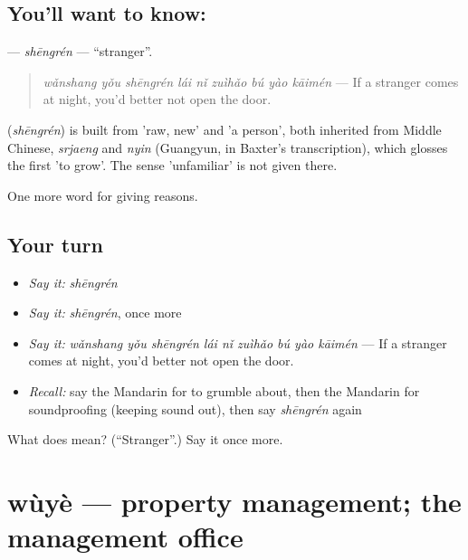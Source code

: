 \subsection*{You'll want to know: }
\textbf{} — \emph{shēngrén} — \textquotedblleft{}stranger\textquotedblright{}.

\begin{quote}
\textbf{} \emph{wǎnshang yǒu shēngrén lái nǐ zuìhǎo bú yào kāimén} — If a stranger comes at night, you'd better not open the door.
\end{quote}

\begin{cousinweb}
\textbf{} (\emph{shēngrén}) is built from  'raw, new' and  'a person', both inherited from Middle Chinese, \emph{srjaeng} and \emph{nyin} (Guangyun, in Baxter's transcription), which glosses the first 'to grow'. The sense 'unfamiliar' is not given there.
\end{cousinweb}

\begin{grammarlens}[title={What you've built}]
One more word for giving reasons.
\end{grammarlens}

\subsection*{Your turn}
\begin{itemize}
\raggedright
  \item \emph{Say it:} \emph{shēngrén}
  \item \emph{Say it:} \emph{shēngrén}, once more
  \item \emph{Say it:} \emph{wǎnshang yǒu shēngrén lái nǐ zuìhǎo bú yào kāimén} — If a stranger comes at night, you'd better not open the door.
  \item \emph{Recall:} say the Mandarin for to grumble about, then the Mandarin for soundproofing (keeping sound out), then say \emph{shēngrén} again
\end{itemize}

\begin{tcolorbox}[breakable,colback=teal!4,colframe=teal!35!black,title={Before you move on}]
What does  mean? (\textquotedblleft{}Stranger\textquotedblright{}.) Say it once more.
\end{tcolorbox}
\section[wùyè]{wùyè — property management; the management office}

